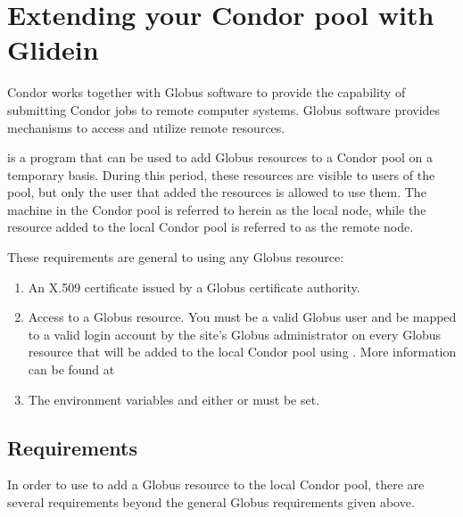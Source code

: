 \section{\label{sec:Glidein}Extending your Condor pool with Glidein}

Condor works together with Globus software to provide the capability
of submitting Condor jobs to remote computer systems.
Globus software provides mechanisms to access and utilize
remote resources.

 is a program that can be used to add Globus resources
to a Condor pool on a temporary basis.
During this period, these resources are visible 
to users of the pool, but only the user
that added the resources is allowed to use them.
The machine in the Condor pool is referred to herein as the
local node, while the resource added to the local Condor pool
is referred to as the remote node.

These requirements are general to using any Globus resource:
\begin{enumerate}

\item An X.509 certificate issued by a Globus certificate authority.

\item Access to a Globus resource.
You must be a valid Globus user and be mapped to a valid login account by
the site's Globus administrator on every Globus resource that will be
added to the local Condor pool using .
More information can be found at 

\item The environment variables  and either
 or 
must be set.

\end{enumerate}


\subsection{ Requirements}
In order to use  to add a Globus resource to the
local Condor pool,
there are several requirements beyond the general Globus requirements
given above.

